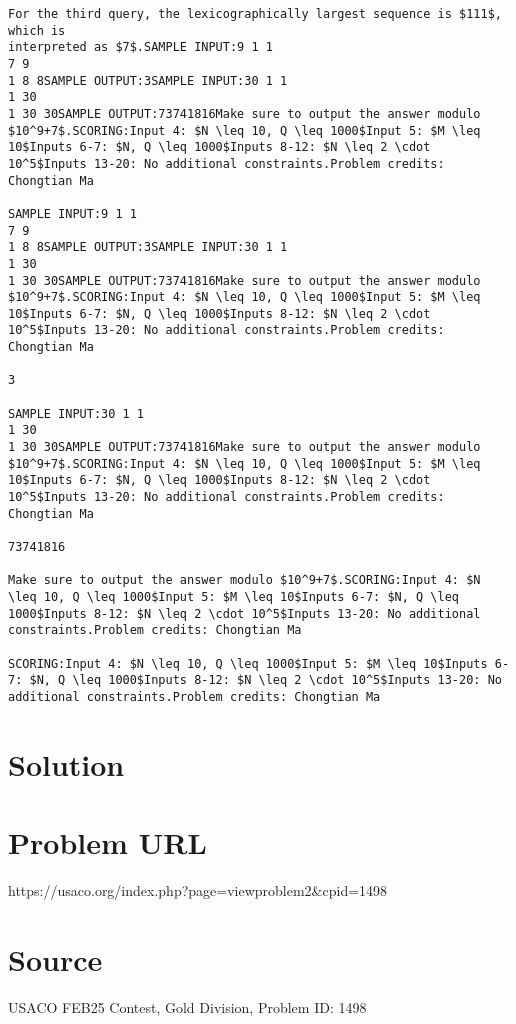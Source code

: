 \documentclass[12pt]{article}
\begin{document}
\begin{verbatim}
For the third query, the lexicographically largest sequence is $111$, which is
interpreted as $7$.SAMPLE INPUT:9 1 1
7 9
1 8 8SAMPLE OUTPUT:3SAMPLE INPUT:30 1 1
1 30
1 30 30SAMPLE OUTPUT:73741816Make sure to output the answer modulo $10^9+7$.SCORING:Input 4: $N \leq 10, Q \leq 1000$Input 5: $M \leq 10$Inputs 6-7: $N, Q \leq 1000$Inputs 8-12: $N \leq 2 \cdot 10^5$Inputs 13-20: No additional constraints.Problem credits: Chongtian Ma

SAMPLE INPUT:9 1 1
7 9
1 8 8SAMPLE OUTPUT:3SAMPLE INPUT:30 1 1
1 30
1 30 30SAMPLE OUTPUT:73741816Make sure to output the answer modulo $10^9+7$.SCORING:Input 4: $N \leq 10, Q \leq 1000$Input 5: $M \leq 10$Inputs 6-7: $N, Q \leq 1000$Inputs 8-12: $N \leq 2 \cdot 10^5$Inputs 13-20: No additional constraints.Problem credits: Chongtian Ma

3

SAMPLE INPUT:30 1 1
1 30
1 30 30SAMPLE OUTPUT:73741816Make sure to output the answer modulo $10^9+7$.SCORING:Input 4: $N \leq 10, Q \leq 1000$Input 5: $M \leq 10$Inputs 6-7: $N, Q \leq 1000$Inputs 8-12: $N \leq 2 \cdot 10^5$Inputs 13-20: No additional constraints.Problem credits: Chongtian Ma

73741816

Make sure to output the answer modulo $10^9+7$.SCORING:Input 4: $N \leq 10, Q \leq 1000$Input 5: $M \leq 10$Inputs 6-7: $N, Q \leq 1000$Inputs 8-12: $N \leq 2 \cdot 10^5$Inputs 13-20: No additional constraints.Problem credits: Chongtian Ma

SCORING:Input 4: $N \leq 10, Q \leq 1000$Input 5: $M \leq 10$Inputs 6-7: $N, Q \leq 1000$Inputs 8-12: $N \leq 2 \cdot 10^5$Inputs 13-20: No additional constraints.Problem credits: Chongtian Ma
\end{verbatim}

\section*{Solution}


\section*{Problem URL}
https://usaco.org/index.php?page=viewproblem2&cpid=1498

\section*{Source}
USACO FEB25 Contest, Gold Division, Problem ID: 1498
\end{document}
